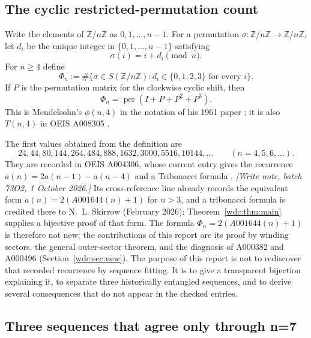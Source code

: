 \documentclass[11pt,letterpaper]{article}
\numberwithin{equation}{section}
\theoremstyle{definition}
\newcommand{\Z}{\mathbb Z}
\newcommand{\Zn}{\Z/n\Z}
\newcommand{\per}{\operatorname{per}}
\begin{document}
\subsection{The cyclic restricted-permutation count}

Write the elements of $\Zn$ as $0,1,\dots,n-1$.  For a permutation
$\sigma\colon\Zn\to\Zn$, let $d_i$ be the unique integer in
$\{0,1,\dots,n-1\}$ satisfying
\[
  \sigma(i)=i+d_i\pmod n.
\]
For $n\ge4$ define
\begin{equation}\label{wdc:eq:Phi-definition}
  \Phi_n
  :=\#\bigl\{\sigma\in S(\Zn):d_i\in\{0,1,2,3\}
       \text{ for every }i\bigr\}.
\end{equation}
If $P$ is the permutation matrix for the clockwise cyclic shift, then
\begin{equation}\label{wdc:eq:permanent}
  \Phi_n=\per(I+P+P^2+P^3).
\end{equation}
This is Mendelsohn's $\phi(n,4)$ in the notation of his 1961 paper
\cite{mendelsohn1961}; it is also $T(n,4)$ in OEIS A008305
\cite{oeisA008305}.

The first values obtained from the definition are
\begin{equation}\label{wdc:eq:true-first-values}
  24,44,80,144,264,484,888,1632,3000,5516,10144,\dots
  \qquad(n=4,5,6,\dots).
\end{equation}
They are recorded in OEIS A004306, whose current entry gives the recurrence
$a(n)=2a(n-1)-a(n-4)$ and a Tribonacci formula
\cite{oeisA004306}.  \emph{[Write note, batch 73O2, 1 October 2026.]}
Its cross-reference line already records the equivalent form
$a(n)=2(A001644(n)+1)$ for $n>3$, and a tribonacci formula is credited there
to N.~L. Skirrow (February 2026); Theorem~\ref{wdc:thm:main} supplies a
bijective proof of that form.  The formula
$\Phi_n=2(A001644(n)+1)$ is therefore not new; the contributions of this
report are its proof by winding sectors, the general outer-sector theorem,
and the diagnosis of A000382 and A000496 (Section~\ref{wdc:sec:new}).
The purpose of this report is not to rediscover that
recorded recurrence by sequence fitting.  It is to give a transparent
bijection explaining it, to separate three historically entangled sequences,
and to derive several consequences that do not appear in the checked entries.

\subsection{Three sequences that agree only through n=7}
\end{document}
